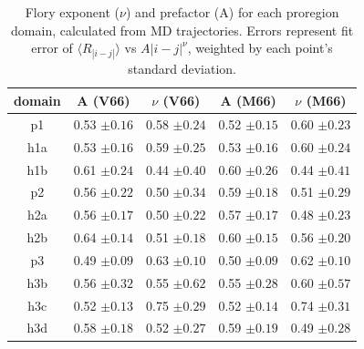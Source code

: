 \documentclass[10pt,letterpaper]{article}
\begin{document}
\begin{table}[ht]
\caption{Flory exponent ($\nu$) and prefactor (A) for each proregion domain, calculated from MD trajectories. Errors represent fit error of $\langle R_{|i-j|}\rangle$ vs  $A|i-j|^{\nu}$, weighted by each point's standard deviation.}
\label{t1}
\begin{tabular}{|c|c|c|c|c|}
\hline
domain & A (V66)  & $\nu$ (V66) & A (M66)  & $\nu$ (M66)\\          
\hline
p1 &  0.53 $\pm{ 0.16}$ & 0.58 $\pm{ 0.24}$ &  0.52 $\pm{0.15}$ & 0.60 $\pm{0.23}$ \\
\hline
h1a &  0.53 $\pm{ 0.16}$ & 0.59 $\pm{ 0.25}$ &  0.53 $\pm{0.16}$ & 0.60 $\pm{0.24}$ \\
\hline
h1b & 0.61  $\pm{0.24 }$ &0.44  $\pm{0.40 }$ &  0.60 $\pm{0.26}$ & 0.44 $\pm{0.41}$ \\
\hline
p2 & 0.56  $\pm{0.22 }$ &0.50  $\pm{0.34 }$ &  0.59 $\pm{0.18}$ & 0.51 $\pm{0.29}$ \\
\hline
h2a &  0.56 $\pm{ 0.17}$ & 0.50 $\pm{ 0.22}$ &  0.57 $\pm{0.17}$ & 0.48 $\pm{0.23}$ \\
\hline
h2b &  0.64 $\pm{ 0.14}$ & 0.51 $\pm{ 0.18}$ &  0.60 $\pm{0.15}$ & 0.56 $\pm{0.20}$ \\
\hline
p3 &  0.49 $\pm{ 0.09}$ & 0.63 $\pm{ 0.10}$ &  0.50 $\pm{0.09}$ & 0.62 $\pm{0.10}$ \\
\hline
h3b &  0.56 $\pm{ 0.32}$ & 0.55 $\pm{ 0.62}$ &  0.55 $\pm{0.28}$ & 0.60 $\pm{0.57}$ \\
\hline
h3c &  0.52 $\pm{ 0.13}$ & 0.75 $\pm{ 0.29}$ &  0.52 $\pm{0.14}$ & 0.74 $\pm{0.31}$ \\
\hline
h3d & 0.58  $\pm{0.18 }$ &0.52  $\pm{0.27 }$ &  0.59 $\pm{0.19}$ & 0.49 $\pm{0.28}$ \\
\hline
\end{tabular}

\end{table}
\end{document}
